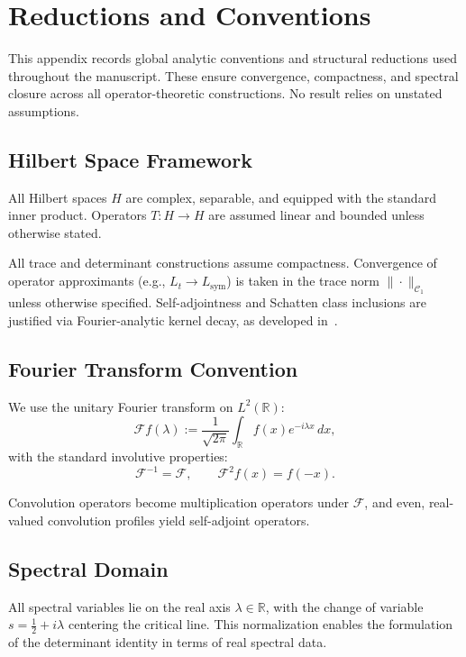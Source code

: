 \section{Reductions and Conventions}
\label{app:reductions-and-conventions}

This appendix records global analytic conventions and structural reductions used throughout the manuscript. These ensure convergence, compactness, and spectral closure across all operator-theoretic constructions. No result relies on unstated assumptions.

\subsection*{Hilbert Space Framework}

All Hilbert spaces \( H \) are complex, separable, and equipped with the standard inner product. Operators \( T : H \to H \) are assumed linear and bounded unless otherwise stated.

All trace and determinant constructions assume compactness. Convergence of operator approximants (e.g., \( L_t \to L_{\mathrm{sym}} \)) is taken in the trace norm \( \|\cdot\|_{\mathcal{C}_1} \) unless otherwise specified. Self-adjointness and Schatten class inclusions are justified via Fourier-analytic kernel decay, as developed in~\cite{Simon2005TraceIdeals, ReedSimon1980I}.

\subsection*{Fourier Transform Convention}

We use the unitary Fourier transform on \( L^2(\mathbb{R}) \):
\[
\mathcal{F}f(\lambda) := \frac{1}{\sqrt{2\pi}} \int_{\mathbb{R}} f(x) e^{-i\lambda x}\, dx,
\]
with the standard involutive properties:
\[
\mathcal{F}^{-1} = \mathcal{F}, \qquad \mathcal{F}^2 f(x) = f(-x).
\]

Convolution operators become multiplication operators under \( \mathcal{F} \), and even, real-valued convolution profiles yield self-adjoint operators.

\subsection*{Spectral Domain}

All spectral variables lie on the real axis \( \lambda \in \mathbb{R} \), with the change of variable \( s = \tfrac{1}{2} + i\lambda \) centering the critical line. This normalization enables the formulation of the determinant identity in terms of real spectral data.

